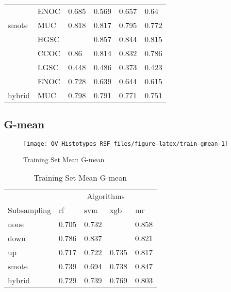 \documentclass[
]{report}
\begin{document}
\begin{table}
\begin{tabular}[t]{l|l|l|l|l|l}
\cline{2-6}
 & ENOC & 0.685 & 0.569 & 0.657 & 0.64\\
\cline{2-6}
\multirow{-5}{*}{\raggedright\arraybackslash smote} & MUC & 0.818 & 0.817 & 0.795 & 0.772\\
\cline{1-6}
 & HGSC & \cellcolor[HTML]{90ee90}{0.876} & 0.857 & 0.844 & 0.815\\
\cline{2-6}
 & CCOC & 0.86 & 0.814 & 0.832 & 0.786\\
\cline{2-6}
 & LGSC & 0.448 & 0.486 & 0.373 & 0.423\\
\cline{2-6}
 & ENOC & 0.728 & 0.639 & 0.644 & 0.615\\
\cline{2-6}
\multirow{-5}{*}{\raggedright\arraybackslash hybrid} & MUC & 0.798 & 0.791 & 0.771 & 0.751\\
\hline
\end{tabular}
\end{table}

\hypertarget{g-mean}{%
\subsection{G-mean}\label{g-mean}}

\begin{figure}[H]

{\centering \texttt{[image: OV\_Histotypes\_RSF\_files/figure-latex/train-gmean-1]} 

}

\caption{Training Set Mean G-mean}\label{fig:train-gmean}
\end{figure}

\begin{table}

\caption{\label{tab:train-gmean-table}Training Set Mean G-mean}
\centering
\begin{tabular}[t]{l|l|l|l|l}
\hline
\multicolumn{1}{c|}{ } & \multicolumn{4}{c}{Algorithms} \\
\cline{2-5}
Subsampling & rf & svm & xgb & mr\\
\hline
none & 0.705 & 0.732 & \cellcolor[HTML]{90ee90}{1} & 0.858\\
\hline
down & 0.786 & 0.837 & \cellcolor[HTML]{90ee90}{1} & 0.821\\
\hline
up & 0.717 & 0.722 & 0.735 & 0.817\\
\hline
smote & 0.739 & 0.694 & 0.738 & 0.847\\
\hline
hybrid & 0.729 & 0.739 & 0.769 & 0.803\\
\hline
\end{tabular}
\end{table}
\end{document}
